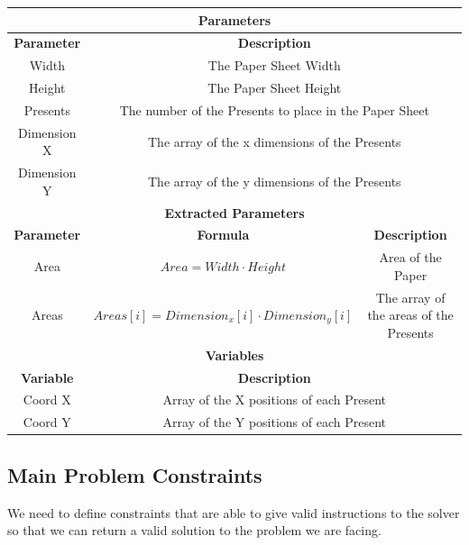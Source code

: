 \begin{center}
	\begin{adjustwidth}{-1.5cm}{}
		\begin{tabular}{|c|c|c|}
			\hline
			\multicolumn{3}{|c|}{\textbf{Parameters}} \\
			\hline
			\textbf{Parameter} & \multicolumn{2}{|c|}{\textbf{Description}} \\
			\hline
			Width & \multicolumn{2}{|c|}{The Paper Sheet Width} \\
			\hline
			Height & \multicolumn{2}{|c|}{The Paper Sheet Height} \\
			\hline
			Presents & \multicolumn{2}{|c|}{The number of the Presents to place in the Paper Sheet} \\
			\hline
			Dimension X & \multicolumn{2}{|c|}{The array of the x dimensions of the Presents} \\
			\hline
			Dimension Y & \multicolumn{2}{|c|}{The array of the y dimensions of the Presents} \\
			\hline
			\multicolumn{3}{|c|}{\textbf{Extracted Parameters}} \\
			\hline
			\textbf{Parameter} & \textbf{Formula} & \textbf{Description} \\
			\hline
			Area & $Area = Width \cdot Height$ & Area of the Paper \\
			\hline
			Areas & $Areas[i] = Dimension_x[i] \cdot Dimension_y[i]$ & The array of the areas of the Presents \\
			\hline
			\multicolumn{3}{|c|}{\textbf{Variables}} \\
			\hline
			\textbf{Variable} & \multicolumn{2}{|c|}{\textbf{Description}} \\
			\hline
			Coord X &  \multicolumn{2}{|c|}{Array of the X positions of each Present} \\
			\hline
			Coord Y &  \multicolumn{2}{|c|}{Array of the Y positions of each Present} \\
			\hline
		\end{tabular}
	\end{adjustwidth}
\end{center}

\subsection{Main Problem Constraints}

We need to define constraints that are able to give valid instructions to the solver so that we can return a valid solution to the problem we are facing.

